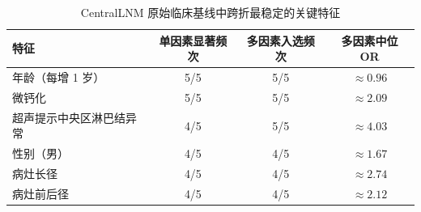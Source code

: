 \begin{table}[H]
\centering
\caption{CentralLNM 原始临床基线中跨折最稳定的关键特征}
\label{tab:clinical_predictors_central}
\small
\begin{tabular}{p{}ccc}
\toprule
特征 & 单因素显著频次 & 多因素入选频次 & 多因素中位 OR \\
\midrule
年龄（每增 1 岁） & 5/5 & 5/5 & $\approx 0.96$ \\
微钙化 & 5/5 & 5/5 & $\approx 2.09$ \\
超声提示中央区淋巴结异常 & 4/5 & 5/5 & $\approx 4.03$ \\
性别（男） & 4/5 & 4/5 & $\approx 1.67$ \\
病灶长径 & 4/5 & 4/5 & $\approx 2.74$ \\
病灶前后径 & 4/5 & 4/5 & $\approx 2.12$ \\
\bottomrule
\end{tabular}
\end{table}
